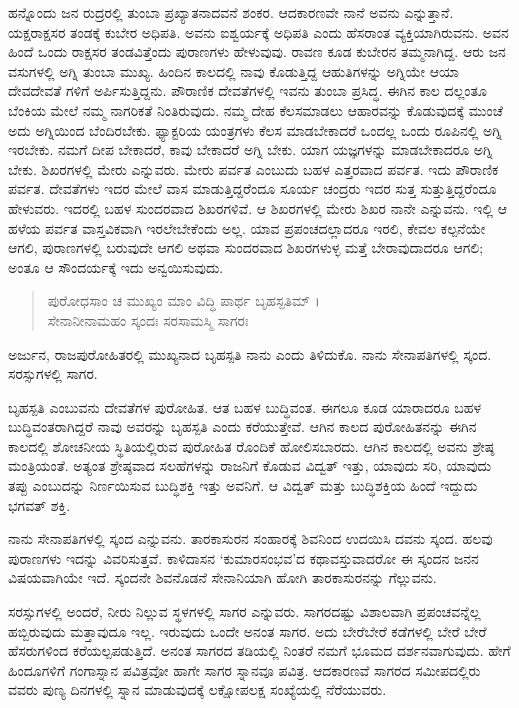ಹನ್ನೊಂದು ಜನ ರುದ್ರರಲ್ಲಿ ತುಂಬಾ ಪ್ರಖ್ಯಾತನಾದವನೆ ಶಂಕರ. ಆದಕಾರಣವೇ ನಾನೆ ಅವನು ಎನ್ನುತ್ತಾನೆ. ಯಕ್ಷರಾಕ್ಷಸರ ತಂಡಕ್ಕೆ ಕುಬೇರ ಅಧಿಪತಿ. ಅವನು ಐಶ್ವರ್ಯಕ್ಕೆ ಅಧಿಪತಿ ಎಂದು ಹೆಸರಾಂತ ವ್ಯಕ್ತಿಯಾಗಿರುವನು. ಅವನ ಹಿಂದೆ ಒಂದು ರಾಕ್ಷಸರ ತಂಡವಿತ್ತೆಂದು ಪುರಾಣಗಳು ಹೇಳುವುವು. ರಾವಣ ಕೂಡ ಕುಬೇರನ ತಮ್ಮನಾಗಿದ್ದ. ಆರು ಜನ ವಸುಗಳಲ್ಲಿ ಅಗ್ನಿ ತುಂಬಾ ಮುಖ್ಯ. ಹಿಂದಿನ ಕಾಲದಲ್ಲಿ ನಾವು ಕೊಡುತ್ತಿದ್ದ ಆಹುತಿಗಳನ್ನು ಅಗ್ನಿಯೇ ಆಯಾ ದೇವದೇವತೆ ಗಳಿಗೆ ಅರ್ಪಿಸುತ್ತಿದ್ದನು. ಪೌರಾಣಿಕ ದೇವತೆಗಳಲ್ಲಿ ಇವನು ತುಂಬಾ ಪ್ರಸಿದ್ಧ. ಈಗಿನ ಕಾಲ ದಲ್ಲಂತೂ ಬೆಂಕಿಯ ಮೇಲೆ ನಮ್ಮ ನಾಗರಿಕತೆ ನಿಂತಿರುವುದು. ನಮ್ಮ ದೇಹ ಕೆಲಸಮಾಡಲು ಆಹಾರವನ್ನು ಕೊಡುವುದಕ್ಕೆ ಮುಂಚೆ ಅದು ಅಗ್ನಿಯಿಂದ ಬೆಂದಿರಬೇಕು. ಫ್ಯಾಕ್ಟರಿಯ ಯಂತ್ರಗಳು ಕೆಲಸ ಮಾಡಬೇಕಾದರೆ ಒಂದಲ್ಲ ಒಂದು ರೂಪಿನಲ್ಲಿ ಅಗ್ನಿ ಇರಬೇಕು. ನಮಗೆ ದೀಪ ಬೇಕಾದರೆ, ಕಾವು ಬೇಕಾದರೆ ಅಗ್ನಿ ಬೇಕು. ಯಾಗ ಯಜ್ಞಗಳನ್ನು ಮಾಡಬೇಕಾದರೂ ಅಗ್ನಿ ಬೇಕು. ಶಿಖರಗಳಲ್ಲಿ ಮೇರು ಎನ್ನುವರು. ಮೇರು ಪರ್ವತ ಎಂಬುದು ಬಹಳ ಎತ್ತರವಾದ ಪರ್ವತ. ಇದು ಪೌರಾಣಿಕ ಪರ್ವತ. ದೇವತೆಗಳು ಇದರ ಮೇಲೆ ವಾಸ ಮಾಡುತ್ತಿದ್ದರೆಂದೂ ಸೂರ್ಯ ಚಂದ್ರರು ಇದರ ಸುತ್ತ ಸುತ್ತುತ್ತಿದ್ದರೆಂದೂ ಹೇಳುವರು. ಇದರಲ್ಲಿ ಬಹಳ ಸುಂದರವಾದ ಶಿಖರಗಳಿವೆ. ಆ ಶಿಖರಗಳಲ್ಲಿ ಮೇರು ಶಿಖರ ನಾನೇ ಎನ್ನುವನು. ಇಲ್ಲಿ ಆ ಹಳೆಯ ಪರ್ವತ ವಾಸ್ತವಿಕವಾಗಿ ಇರಲೇಬೇಕೆಂದು ಅಲ್ಲ. ಯಾವ ಪ್ರಪಂಚದಲ್ಲಾದರೂ ಇರಲಿ, ಕೇವಲ ಕಲ್ಪನೆಯೇ ಆಗಲಿ, ಪುರಾಣಗಳಲ್ಲಿ ಬರುವುದೇ ಆಗಲಿ ಅಥವಾ ಸುಂದರವಾದ ಶಿಖರಗಳುಳ್ಳ ಮತ್ತೆ ಬೇರಾವುದಾದರೂ ಆಗಲಿ; ಅಂತೂ ಆ ಸೌಂದರ್ಯಕ್ಕೆ ಇದು ಅನ್ವಯಿಸುವುದು.

\begin{verse}
ಪುರೋಧಸಾಂ ಚ ಮುಖ್ಯಂ ಮಾಂ ವಿದ್ಧಿ ಪಾರ್ಥ ಬೃಹಸ್ಪತಿಮ್ ।\\ಸೇನಾನೀನಾಮಹಂ ಸ್ಕಂದಃ ಸರಸಾಮಸ್ಮಿ ಸಾಗರಃ 
\end{verse}

{\small ಅರ್ಜುನ, ರಾಜಪುರೋಹಿತರಲ್ಲಿ ಮುಖ್ಯನಾದ ಬೃಹಸ್ಪತಿ ನಾನು ಎಂದು ತಿಳಿದುಕೊ. ನಾನು ಸೇನಾಪತಿಗಳಲ್ಲಿ ಸ್ಕಂದ. ಸರಸ್ಸುಗಳಲ್ಲಿ ಸಾಗರ.}

ಬೃಹಸ್ಪತಿ ಎಂಬುವನು ದೇವತೆಗಳ ಪುರೋಹಿತ. ಆತ ಬಹಳ ಬುದ್ಧಿವಂತ. ಈಗಲೂ ಕೂಡ ಯಾರಾದರೂ ಬಹಳ ಬುದ್ಧಿವಂತರಾಗಿದ್ದರೆ ನಾವು ಅವರನ್ನು ಬೃಹಸ್ಪತಿ ಎಂದು ಕರೆಯುತ್ತೇವೆ. ಆಗಿನ ಕಾಲದ ಪುರೋಹಿತನನ್ನು ಈಗಿನ ಕಾಲದಲ್ಲಿ ಶೋಚನೀಯ ಸ್ಥಿತಿಯಲ್ಲಿರುವ ಪುರೋಹಿತ ರೊಂದಿಕೆ ಹೋಲಿಸಬಾರದು. ಆಗಿನ ಕಾಲದಲ್ಲಿ ಅವನು ಶ್ರೇಷ್ಠ ಮಂತ್ರಿಯಂತೆ. ಅತ್ಯಂತ ಶ್ರೇಷ್ಠವಾದ ಸಲಹೆಗಳನ್ನು ರಾಜನಿಗೆ ಕೊಡುವ ವಿದ್ವತ್ ಇತ್ತು, ಯಾವುದು ಸರಿ, ಯಾವುದು ತಪ್ಪು ಎಂಬುದನ್ನು ನಿರ್ಣಯಿಸುವ ಬುದ್ಧಿಶಕ್ತಿ ಇತ್ತು ಅವನಿಗೆ. ಆ ವಿದ್ವತ್ ಮತ್ತು ಬುದ್ಧಿಶಕ್ತಿಯ ಹಿಂದೆ ಇದ್ದುದು ಭಗವತ್ ಶಕ್ತಿ.

ನಾನು ಸೇನಾಪತಿಗಳಲ್ಲಿ ಸ್ಕಂದ ಎನ್ನುವನು. ತಾರಕಾಸುರನ ಸಂಹಾರಕ್ಕೆ ಶಿವನಿಂದ ಉದಯಿಸಿ ದವನು ಸ್ಕಂದ. ಹಲವು ಪುರಾಣಗಳು ಇದನ್ನು ವಿವರಿಸುತ್ತವೆ. ಕಾಳಿದಾಸನ ‘ಕುಮಾರಸಂಭವ’ದ ಕಥಾವಸ್ತುವಾದರೋ ಈ ಸ್ಕಂದನ ಜನನ ವಿಷಯವಾಗಿಯೇ ಇದೆ. ಸ್ಕಂದನೇ ಶಿವನೊಡನೆ ಸೇನಾನಿಯಾಗಿ ಹೋಗಿ ತಾರಕಾಸುರನನ್ನು ಗೆಲ್ಲುವನು.

ಸರಸ್ಸುಗಳಲ್ಲಿ ಅಂದರೆ, ನೀರು ನಿಲ್ಲುವ ಸ್ಥಳಗಳಲ್ಲಿ ಸಾಗರ ಎನ್ನುವರು. ಸಾಗರದಷ್ಟು ವಿಶಾಲವಾಗಿ ಪ್ರಪಂಚವನ್ನೆಲ್ಲ ಹಬ್ಬಿರುವುದು ಮತ್ತಾವುದೂ ಇಲ್ಲ. ಇರುವುದು ಒಂದೇ ಅನಂತ ಸಾಗರ. ಅದು ಬೇರೆಬೇರೆ ಕಡೆಗಳಲ್ಲಿ ಬೇರೆ ಬೇರೆ ಹೆಸರುಗಳಿಂದ ಕರೆಯಲ್ಪಪಡುತ್ತಿದೆ. ಅನಂತ ಸಾಗರದ ತಡಿಯಲ್ಲಿ ನಿಂತರೆ ನಮಗೆ ಭೂಮದ ದರ್ಶನವಾಗುವುದು. ಹೇಗೆ ಹಿಂದೂಗಳಿಗೆ ಗಂಗಾಸ್ನಾನ ಪವಿತ್ರವೋ ಹಾಗೇ ಸಾಗರ ಸ್ನಾನವೂ ಪವಿತ್ರ. ಆದಕಾರಣವೆ ಸಾಗರದ ಸಮೀಪದಲ್ಲಿರು ವವರು ಪುಣ್ಯ ದಿನಗಳಲ್ಲಿ ಸ್ನಾನ ಮಾಡುವುದಕ್ಕೆ ಲಕ್ಷೋಪಲಕ್ಷ ಸಂಖ್ಯೆಯಲ್ಲಿ ನೆರೆಯುವರು.


